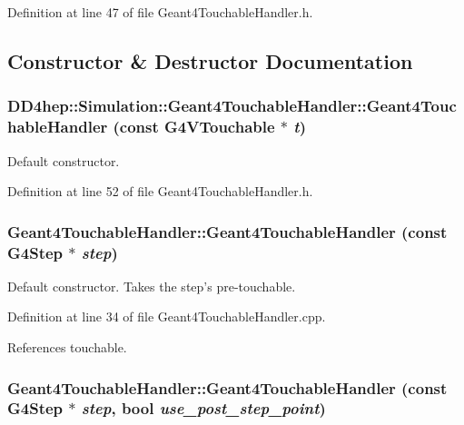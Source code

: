 Definition at line 47 of file Geant4TouchableHandler.h.

\subsection{Constructor \& Destructor Documentation}
\hypertarget{class_d_d4hep_1_1_simulation_1_1_geant4_touchable_handler_a94190007b2cfab9cab06a0de576cc23f}{
\subsubsection[{Geant4TouchableHandler}]{\setlength{\rightskip}{0pt plus 5cm}DD4hep::Simulation::Geant4TouchableHandler::Geant4TouchableHandler (const G4VTouchable $\ast$ {\em t})}}
\label{class_d_d4hep_1_1_simulation_1_1_geant4_touchable_handler_a94190007b2cfab9cab06a0de576cc23f}


Default constructor. 

Definition at line 52 of file Geant4TouchableHandler.h.\hypertarget{class_d_d4hep_1_1_simulation_1_1_geant4_touchable_handler_af2bd4df9a960cd1093e18204c8097b39}{
\subsubsection[{Geant4TouchableHandler}]{\setlength{\rightskip}{0pt plus 5cm}Geant4TouchableHandler::Geant4TouchableHandler (const G4Step $\ast$ {\em step})}}
\label{class_d_d4hep_1_1_simulation_1_1_geant4_touchable_handler_af2bd4df9a960cd1093e18204c8097b39}


Default constructor. Takes the step's pre-\/touchable. 

Definition at line 34 of file Geant4TouchableHandler.cpp.

References touchable.\hypertarget{class_d_d4hep_1_1_simulation_1_1_geant4_touchable_handler_ac4e6b8879c60c24faac7389def633092}{
\subsubsection[{Geant4TouchableHandler}]{\setlength{\rightskip}{0pt plus 5cm}Geant4TouchableHandler::Geant4TouchableHandler (const G4Step $\ast$ {\em step}, \/  bool {\em use\_\-post\_\-step\_\-point})}}
\label{class_d_d4hep_1_1_simulation_1_1_geant4_touchable_handler_ac4e6b8879c60c24faac7389def633092}


